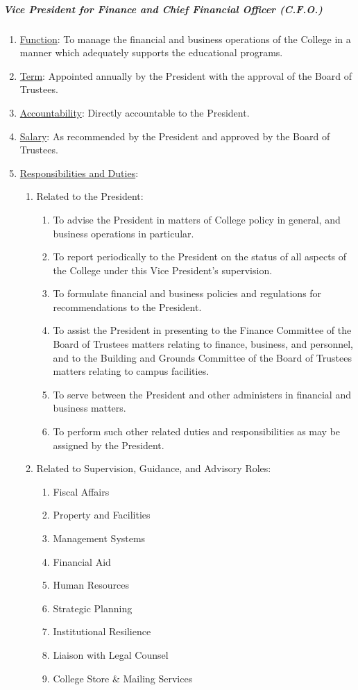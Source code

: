 				\subparagraph{Vice President for Finance and Chief Financial Officer (C.F.O.)}
					\begin{enumerate}
						\item{\underline{Function}: To manage the financial and business operations of the College in a manner which adequately supports the educational programs.}
						\item{\underline{Term}: Appointed annually by the President with the approval of the Board of Trustees.}
						\item{\underline{Accountability}: Directly accountable to the President.}
						\item{\underline{Salary}: As recommended by the President and approved by the Board of Trustees.}
						\item{\underline{Responsibilities and Duties}:
							\begin{enumerate}
								\item{Related to the President:
									\begin{enumerate}
										\item{To advise the President in matters of College policy in general, and business operations in particular.}
										\item{To report periodically to the President on the status of all aspects of the College under this Vice President's supervision.}
										\item{To formulate financial and business policies and regulations for recommendations to the President.}
										\item{To assist the President in presenting to the Finance Committee of the Board of Trustees matters relating to finance, business, and personnel, and to the Building and Grounds Committee of the Board of Trustees matters relating to campus facilities.}
										\item{To serve between the President and other administers in financial and business matters.}
										\item{To perform such other related duties and responsibilities as may be assigned by the President.}
									\end{enumerate}
								}
								\item{Related to Supervision, Guidance, and Advisory Roles:
									\begin{enumerate}
										\item{Fiscal Affairs}
										\item{Property and Facilities}
										\item{Management Systems}
										\item{Financial Aid}
										\item{Human Resources}
										\item{Strategic Planning}
										\item{Institutional Resilience}
										\item{Liaison with Legal Counsel}
										\item{College Store \& Mailing Services}
									\end{enumerate}
								}
							\end{enumerate}
						}
					\end{enumerate}
